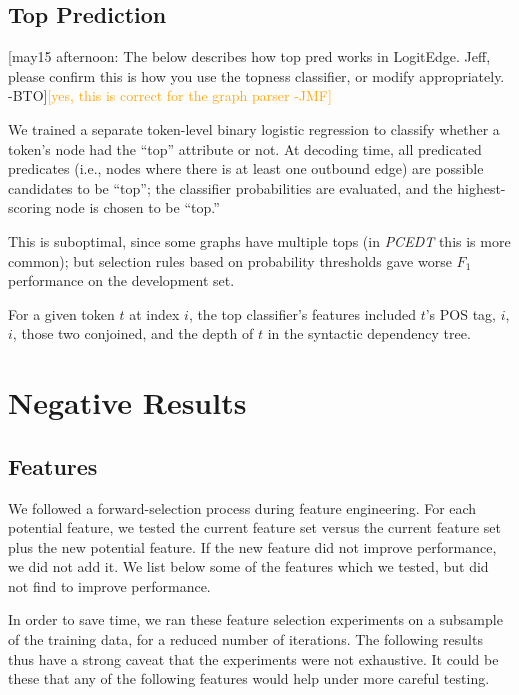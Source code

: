 \documentclass[11pt]{article}
\newcommand{\bocomment}[1]{\textcolor{Bittersweet}{[#1 -BTO]}}
\newcommand{\jmf}[1]{\textcolor{orange}{[#1 -JMF]}}
\newcommand{\codenote}[1]{}
\begin{document}
\subsection{Top Prediction} \label{s:top_model}

\bocomment{may15 afternoon: The below describes how top pred works in LogitEdge.  Jeff, please confirm this is how you use the topness classifier, or modify appropriately.}\jmf{yes, this is correct for the graph parser}

We trained a separate token-level binary logistic regression to classify
whether a token's node had the ``top'' attribute or not.
At decoding time, all predicated predicates (i.e., nodes where there is at least one outbound edge)
are possible candidates to be ``top'';
the classifier probabilities are evaluated, and the highest-scoring node is
chosen to be ``top.''
\codenote{LogitEdge: MyGraph::decideTops()}
This is suboptimal, since some graphs have multiple tops (in \emph{PCEDT} this is
more common);
but selection rules based on probability thresholds gave worse $F_1$
performance on the development set. \codenote{\url{https://github.com/Noahs-ARK/semeval-2014/issues/37}}

For a given token $t$ at index $i$, the top classifier's features
included $t$'s POS tag, $i$, $i$, those two conjoined, and the depth
of $t$ in the syntactic dependency tree.


\section{Negative Results}

\subsection{Features}
\label{s:badfeatures}

We followed a forward-selection process during feature engineering.
For each potential feature, we tested the current feature set versus the current
feature set plus the new potential feature.
If the new feature did not improve performance, we did not add it.
We list below some of the features which we tested, but did not find to improve
performance.

In order to save time, we ran these feature selection experiments
on a subsample of the training data, for a reduced number of iterations.
The following results thus have a 
 strong caveat that the experiments were
not exhaustive.  It could be these that any of the following features would help under more careful testing.
\end{document}
